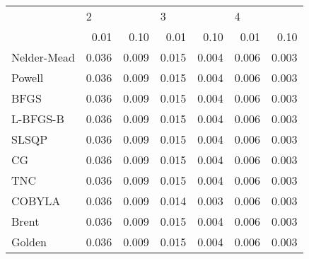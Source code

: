 \begin{tabular}{lrrrrrr}
\toprule
{} & \multicolumn{2}{l}{2} & \multicolumn{2}{l}{3} & \multicolumn{2}{l}{4} \\
{} &   0.01 &   0.10 &   0.01 &   0.10 &   0.01 &   0.10 \\
\midrule
Nelder-Mead &  0.036 &  0.009 &  0.015 &  0.004 &  0.006 &  0.003 \\
Powell      &  0.036 &  0.009 &  0.015 &  0.004 &  0.006 &  0.003 \\
BFGS        &  0.036 &  0.009 &  0.015 &  0.004 &  0.006 &  0.003 \\
L-BFGS-B    &  0.036 &  0.009 &  0.015 &  0.004 &  0.006 &  0.003 \\
SLSQP       &  0.036 &  0.009 &  0.015 &  0.004 &  0.006 &  0.003 \\
CG          &  0.036 &  0.009 &  0.015 &  0.004 &  0.006 &  0.003 \\
TNC         &  0.036 &  0.009 &  0.015 &  0.004 &  0.006 &  0.003 \\
COBYLA      &  0.036 &  0.009 &  0.014 &  0.003 &  0.006 &  0.003 \\
Brent       &  0.036 &  0.009 &  0.015 &  0.004 &  0.006 &  0.003 \\
Golden      &  0.036 &  0.009 &  0.015 &  0.004 &  0.006 &  0.003 \\
\bottomrule
\end{tabular}
